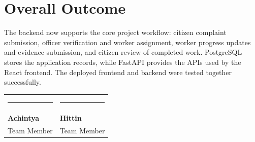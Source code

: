 \documentclass[12pt,a4paper]{article}
\begin{document}
\section{Overall Outcome}
The backend now supports the core project workflow: citizen complaint submission, officer verification and worker assignment, worker progress updates and evidence submission, and citizen review of completed work. PostgreSQL stores the application records, while FastAPI provides the APIs used by the React frontend. The deployed frontend and backend were tested together successfully.

\vspace{12pt}
\begin{tabularx}{\textwidth}{X X}
\centering\rule{0.8\linewidth}{0.4pt} & \centering\rule{0.8\linewidth}{0.4pt} \\
\centering\textbf{Achintya} & \centering\textbf{Hittin} \\
\centering\small Team Member & \centering\small Team Member
\end{tabularx}
\end{document}
